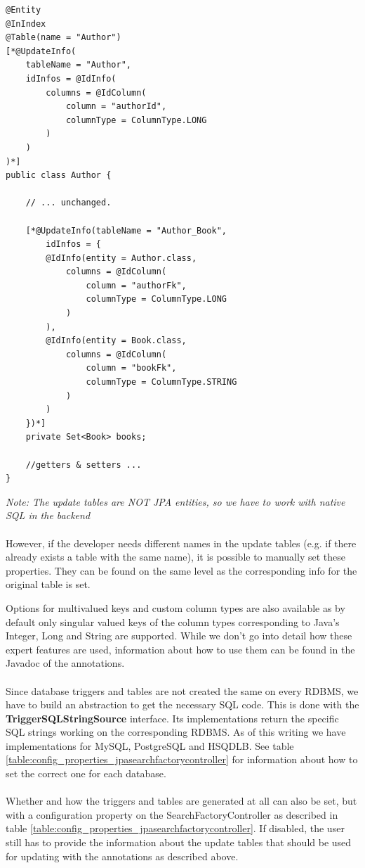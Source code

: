 \pagebreak

\lstset{language=java}
\begin{lstlisting}[frame=htrbl, caption={Author.java with Hibernate Search annotations}, label={lst:author.java_3}]
@Entity
@InIndex
@Table(name = "Author")
[*@UpdateInfo(
	tableName = "Author", 
	idInfos = @IdInfo(
		columns = @IdColumn(
			column = "authorId", 
			columnType = ColumnType.LONG
		)
	)
)*]
public class Author {
	
	// ... unchanged.
	
	[*@UpdateInfo(tableName = "Author_Book", 
		idInfos = {
		@IdInfo(entity = Author.class, 
			columns = @IdColumn(
				column = "authorFk",
				columnType = ColumnType.LONG
			)
		),
		@IdInfo(entity = Book.class,
			columns = @IdColumn(
				column = "bookFk",
				columnType = ColumnType.STRING
			)
		)
	})*]
	private Set<Book> books;
	
	//getters & setters ...
}
\end{lstlisting}
\noindent
\textit{Note: The update tables are NOT JPA entities, so we have to work with native SQL in the backend}
\\\\
\noindent
However, if the developer needs different names in the update tables (e.g. if there already exists a table with the same name), it is possible to manually set these properties. They can be found on the same level as the corresponding info for the original table is set.

\pagebreak

\noindent
Options for multivalued keys and custom column types are also available as by default only singular valued keys of the column types corresponding to Java's Integer, Long and String are supported. While we don't go into detail how these expert features are used, information about how to use them can be found in the Javadoc of the annotations.
\\\\
Since database triggers and tables are not created the same on every RDBMS, we have to build an abstraction to get the necessary SQL code. This is done with the \textbf{TriggerSQLStringSource} interface. Its implementations return the specific SQL strings working on the corresponding RDBMS. As of this writing we have implementations for MySQL, PostgreSQL and HSQDLB. See table \ref{table:config_properties_jpasearchfactorycontroller} for information about how to set the correct one for each database.
\\\\
Whether and how the triggers and tables are generated at all can also be set, but with a configuration property on the SearchFactoryController as described in table  \ref{table:config_properties_jpasearchfactorycontroller}. If disabled, the user still has to provide the information about the update tables that should be used for updating with the annotations as described above.

